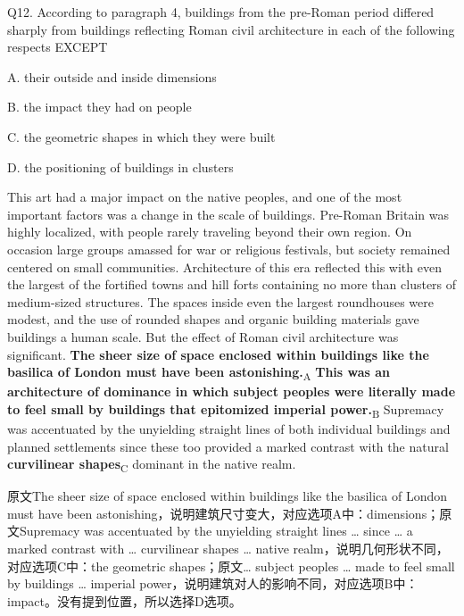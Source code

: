 \begin{blk}
    \begin{qst}
        Q12. According to paragraph 4, buildings from the pre-Roman period differed sharply from buildings reflecting Roman civil architecture in each of the following respects EXCEPT
    \end{qst}

    \begin{chc}
        A. their outside and inside dimensions

        B. the impact they had on people

        C. the geometric shapes in which they were built

        D. the positioning of buildings in clusters
    \end{chc}

    \begin{psgq}
        This art had a major impact on the native peoples, and one of the most important factors was a change in the scale of buildings. Pre-Roman Britain was highly localized, with people rarely traveling beyond their own region. On occasion large groups amassed for war or religious festivals, but society remained centered on small communities. Architecture of this era reflected this with even the largest of the fortified towns and hill forts containing no more than clusters of medium-sized structures. The spaces inside even the largest roundhouses were modest, and the use of rounded shapes and organic building materials gave buildings a human scale. But the effect of Roman civil architecture was significant. \textbf{The sheer size of space enclosed within buildings like the basilica of London must have been astonishing.}\textsubscript{A} \textbf{This was an architecture of dominance in which subject peoples were literally made to feel small by buildings that epitomized imperial power.}\textsubscript{B} Supremacy was accentuated by the unyielding straight lines of both individual buildings and planned settlements since these too provided a marked contrast with the natural \textbf{curvilinear shapes}\textsubscript{C} dominant in the native realm.
    \end{psgq}

    \begin{nlz}
        原文The sheer size of space enclosed within buildings like the basilica of London must have been astonishing，说明建筑尺寸变大，对应选项A中：dimensions；原文Supremacy was accentuated by the unyielding straight lines … since … a marked contrast with … curvilinear shapes … native realm，说明几何形状不同，对应选项C中：the geometric shapes；原文… subject peoples … made to feel small by buildings … imperial power，说明建筑对人的影响不同，对应选项B中：impact。没有提到位置，所以选择D选项。
    \end{nlz}
\end{blk}